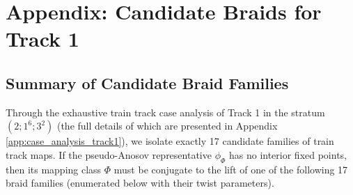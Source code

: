 \chapter[Appendix: Candidate Braids for Track 1]{Appendix: Candidate Braids for Track 1}
\label{app:candidate_braids_track_1}

\section{Summary of Candidate Braid Families}
\label{sec:summary_track1_braids}

Through the exhaustive train track case analysis of Track 1 in the stratum $(2;1^6;3^2)$ (the full details of which are presented in Appendix \ref{app:case_analysis_track1}), we isolate exactly 17 candidate families of train track maps. If the pseudo-Anosov representative $\phi_\Phi$ has no interior fixed points, then its mapping class $\Phi$ must be conjugate to the lift of one of the following 17 braid families (enumerated below with their twist parameters).


